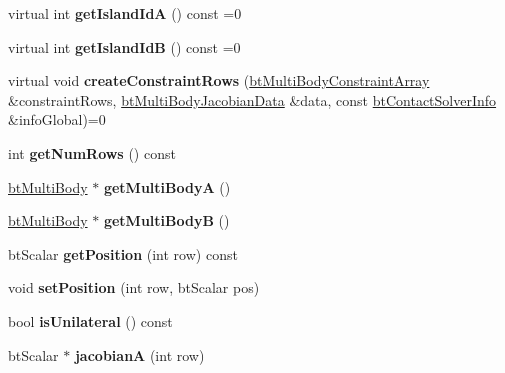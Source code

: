 \begin{DoxyCompactItemize}
virtual int {\bfseries get\+Island\+IdA} () const =0
\item 
\mbox{\label{classbtMultiBodyConstraint_ab305c7ace79332a44134319a9816022a}} 
virtual int {\bfseries get\+Island\+IdB} () const =0
\item 
\mbox{\label{classbtMultiBodyConstraint_a9c20d0b45e909da415345c48cbd99ffa}} 
virtual void {\bfseries create\+Constraint\+Rows} (\hyperlink{classbtAlignedObjectArray}{bt\+Multi\+Body\+Constraint\+Array} \&constraint\+Rows, \hyperlink{structbtMultiBodyJacobianData}{bt\+Multi\+Body\+Jacobian\+Data} \&data, const \hyperlink{structbtContactSolverInfo}{bt\+Contact\+Solver\+Info} \&info\+Global)=0
\item 
\mbox{\label{classbtMultiBodyConstraint_af43b801cb4cd065b987847b59c9f7e1e}} 
int {\bfseries get\+Num\+Rows} () const
\item 
\mbox{\label{classbtMultiBodyConstraint_a61afd0786777b6f4517d2e45e5c1659c}} 
\hyperlink{classbtMultiBody}{bt\+Multi\+Body} $\ast$ {\bfseries get\+Multi\+BodyA} ()
\item 
\mbox{\label{classbtMultiBodyConstraint_a7a5751526a00b81ddfb1b664d8b7f61b}} 
\hyperlink{classbtMultiBody}{bt\+Multi\+Body} $\ast$ {\bfseries get\+Multi\+BodyB} ()
\item 
\mbox{\label{classbtMultiBodyConstraint_a13249f1137e6f00948215807cbbd3f3d}} 
bt\+Scalar {\bfseries get\+Position} (int row) const
\item 
\mbox{\label{classbtMultiBodyConstraint_a3c312406ee40987dc8fb52cc1ba56243}} 
void {\bfseries set\+Position} (int row, bt\+Scalar pos)
\item 
\mbox{\label{classbtMultiBodyConstraint_ab4c15869729f6fd71583498ad3b0bf39}} 
bool {\bfseries is\+Unilateral} () const
\item 
\mbox{\label{classbtMultiBodyConstraint_aa450060c157dad0dbe7af57b49293af8}} 
bt\+Scalar $\ast$ {\bfseries jacobianA} (int row)

\end{DoxyCompactItemize}
